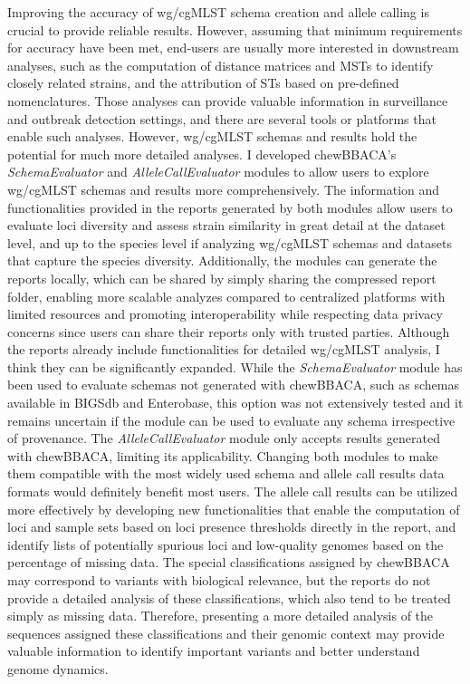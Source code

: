 Improving the accuracy of wg/cgMLST schema creation and allele calling is crucial to provide reliable results. However, assuming that minimum requirements for accuracy have been met, end-users are usually more interested in downstream analyses, such as the computation of distance matrices and \ac{MST}s to identify closely related strains, and the attribution of \ac{ST}s based on pre-defined nomenclatures. Those analyses can provide valuable information in surveillance and outbreak detection settings, and there are several tools or platforms that enable such analyses. However, \ac{wg/cgMLST} schemas and results hold the potential for much more detailed analyses. I developed chewBBACA's \textit{SchemaEvaluator} and \textit{AlleleCallEvaluator} modules to allow users to explore \ac{wg/cgMLST} schemas and results more comprehensively. The information and functionalities provided in the reports generated by both modules allow users to evaluate loci diversity and assess strain similarity in great detail at the dataset level, and up to the species level if analyzing wg/cgMLST schemas and datasets that capture the species diversity. Additionally, the modules can generate the reports locally, which can be shared by simply sharing the compressed report folder, enabling more scalable analyzes compared to centralized platforms with limited resources and promoting interoperability while respecting data privacy concerns since users can share their reports only with trusted parties. 
Although the reports already include functionalities for detailed \ac{wg/cgMLST} analysis, I think they can be significantly expanded. While the \textit{SchemaEvaluator} module has been used to evaluate schemas not generated with chewBBACA, such as schemas available in BIGSdb and Enterobase, this option was not extensively tested and it remains uncertain if the module can be used to evaluate any schema irrespective of provenance. The \textit{AlleleCallEvaluator} module only accepts results generated with chewBBACA, limiting its applicability. Changing both modules to make them compatible with the most widely used schema and allele call results data formats would definitely benefit most users. The allele call results can be utilized more effectively by developing new functionalities that enable the computation of loci and sample sets based on loci presence thresholds directly in the report, and identify lists of potentially spurious loci and low-quality genomes based on the percentage of missing data. The special classifications assigned by chewBBACA may correspond to variants with biological relevance, but the reports do not provide a detailed analysis of these classifications, which also tend to be treated simply as missing data. Therefore, presenting a more detailed analysis of the sequences assigned these classifications and their genomic context may provide valuable information to identify important variants and better understand genome dynamics.
